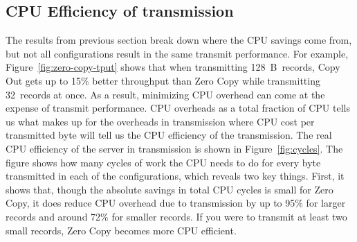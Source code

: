 

\subsection {CPU Efficiency of transmission}
The results from previous section break down where the CPU savings come from,
but not all configurations result in the same transmit performance. For
example, Figure~\ref{fig:zero-copy-tput} shows that when transmitting
128~B~records, Copy Out gets up to 15\% better throughput than Zero Copy while transmitting
32~records at once. As a result, minimizing CPU overhead can come at the expense of transmit
performance. CPU overheads as a total fraction of CPU tells us what makes up for the overheads 
in transmission where CPU cost per transmitted byte will tell us the CPU efficiency of the 
transmission. The real CPU efficiency of the server in transmission is shown in
Figure~\ref{fig:cycles}. The figure shows how many cycles of work the CPU needs to do
for every byte transmitted in each of the configurations, which reveals two key things.
First, it shows that, though the absolute savings in total CPU cycles is small
for Zero Copy, it does reduce CPU overhead due to transmission by up to 95\% for 
larger records and around 72\% for smaller records. If you were to transmit at least 
two small records, Zero Copy becomes more CPU efficient.




%

%


